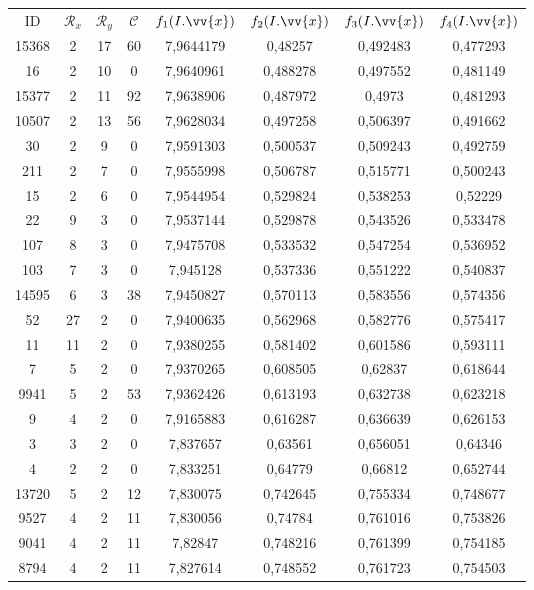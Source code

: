 \scriptsize
\begin{longtable}{|c|c|c|c|c|c|c|c|}
\hline
ID & $\mathscr{R}_x$ & $\mathscr{R}_y$ & $\mathscr{C}$ & $f_1(I.\vv{x})$ & $f_2(I.\vv{x})$ & $f_3(I.\vv{x})$ & $f_4(I.\vv{x})$ \\
15368 & 2 & 17 & 60 & 7,9644179 & 0,48257 & 0,492483 & 0,477293 \\
16 & 2 & 10 & 0 & 7,9640961 & 0,488278 & 0,497552 & 0,481149 \\
15377 & 2 & 11 & 92 & 7,9638906 & 0,487972 & 0,4973 & 0,481293 \\
10507 & 2 & 13 & 56 & 7,9628034 & 0,497258 & 0,506397 & 0,491662 \\
30 & 2 & 9 & 0 & 7,9591303 & 0,500537 & 0,509243 & 0,492759 \\
211 & 2 & 7 & 0 & 7,9555998 & 0,506787 & 0,515771 & 0,500243 \\
15 & 2 & 6 & 0 & 7,9544954 & 0,529824 & 0,538253 & 0,52229 \\
22 & 9 & 3 & 0 & 7,9537144 & 0,529878 & 0,543526 & 0,533478 \\
107 & 8 & 3 & 0 & 7,9475708 & 0,533532 & 0,547254 & 0,536952 \\
103 & 7 & 3 & 0 & 7,945128 & 0,537336 & 0,551222 & 0,540837 \\
14595 & 6 & 3 & 38 & 7,9450827 & 0,570113 & 0,583556 & 0,574356 \\
52 & 27 & 2 & 0 & 7,9400635 & 0,562968 & 0,582776 & 0,575417 \\
11 & 11 & 2 & 0 & 7,9380255 & 0,581402 & 0,601586 & 0,593111 \\
7 & 5 & 2 & 0 & 7,9370265 & 0,608505 & 0,62837 & 0,618644 \\
9941 & 5 & 2 & 53 & 7,9362426 & 0,613193 & 0,632738 & 0,623218 \\
9 & 4 & 2 & 0 & 7,9165883 & 0,616287 & 0,636639 & 0,626153 \\
3 & 3 & 2 & 0 & 7,837657 & 0,63561 & 0,656051 & 0,64346 \\
4 & 2 & 2 & 0 & 7,833251 & 0,64779 & 0,66812 & 0,652744 \\
13720 & 5 & 2 & 12 & 7,830075 & 0,742645 & 0,755334 & 0,748677 \\
9527 & 4 & 2 & 11 & 7,830056 & 0,74784 & 0,761016 & 0,753826 \\
9041 & 4 & 2 & 11 & 7,82847 & 0,748216 & 0,761399 & 0,754185 \\
8794 & 4 & 2 & 11 & 7,827614 & 0,748552 & 0,761723 & 0,754503 \\

\end{longtable}
